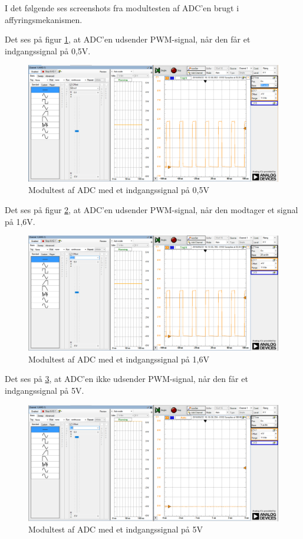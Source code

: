 I det følgende ses screenshots fra modultesten af ADC'en brugt i affyringsmekanismen. 

Det ses på figur \ref{fig:500mV}, at ADC'en udsender PWM-signal, når den får et indgangssignal på 0,5V. 

\begin{figure}[H]
	\centering
	\includegraphics[width=\textwidth]{Test/images/AffyringTest/ADC/0,5V}
	\caption{Modultest af ADC med et indgangssignal på 0,5V}
	\label{fig:500mV}
\end{figure}

Det ses på figur \ref{fig:1600mV}, at ADC'en udsender PWM-signal, når den modtager et signal på 1,6V. 

\begin{figure}[H]
	\centering
	\includegraphics[width=\textwidth]{Test/images/AffyringTest/ADC/1,6V}
	\caption{Modultest af ADC med et indgangssignal på 1,6V}
	\label{fig:1600mV}
\end{figure}

Det ses på \ref{fig:5V}, at ADC'en ikke udsender PWM-signal, når den får et indgangssignal på 5V. 

\begin{figure}[H]
	\centering
	\includegraphics[width=\textwidth]{Test/images/AffyringTest/ADC/5V}
	\caption{Modultest af ADC med et indgangssignal på 5V}
	\label{fig:5V}
\end{figure}

